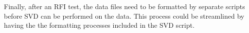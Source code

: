 \documentclass[a4paper,12pt]{article}
\begin{document}
                                                                                                                                                                                                                                                                                                                                                                                                                                                                                                                                                                                                                                                                                                                                                                                                                                                                                                                                                                                                                                                                                                                                                                                                                                                                                                                                                                                                                                                                                                                                                                                                                                                                                                                                                                                                                                                                                                                                                                                                                                                                                                                                                                                                                                                                                                                                                                                                                                                                                                                                                                                                                                                                                                                                                                                                                                                                                                                                                                                                     Finally, after an RFI test, the data files need to be formatted by separate scripts before SVD can be performed on the data. This process could be streamlined by having the the formatting processes included in the SVD script.
\end{document}
